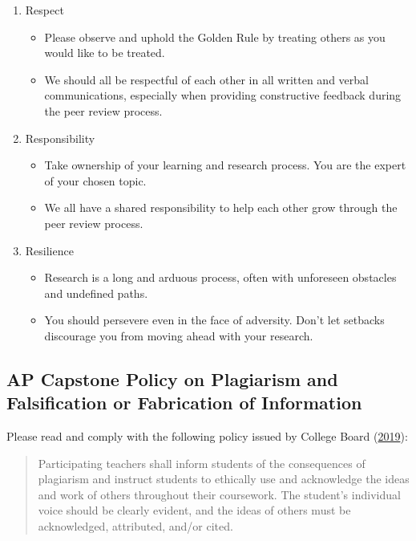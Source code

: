 \documentclass[11pt,]{article}
\providecommand{\tightlist}{%
  \setlength{\itemsep}{0pt}\setlength{\parskip}{0pt}}
\begin{document}
\begin{enumerate}
\def\labelenumi{\arabic{enumi}.}
\item
  Respect

  \begin{itemize}
  \tightlist
  \item
    Please observe and uphold the Golden Rule by treating others as you would like to be treated.
  \item
    We should all be respectful of each other in all written and verbal communications, especially when providing constructive feedback during the peer review process.
  \end{itemize}
\item
  Responsibility

  \begin{itemize}
  \tightlist
  \item
    Take ownership of your learning and research process. You are the expert of your chosen topic.
  \item
    We all have a shared responsibility to help each other grow through the peer review process.
  \end{itemize}
\item
  Resilience

  \begin{itemize}
  \tightlist
  \item
    Research is a long and arduous process, often with unforeseen obstacles and undefined paths.
  \item
    You should persevere even in the face of adversity. Don't let setbacks discourage you from moving ahead with your research.
  \end{itemize}
\end{enumerate}

\hypertarget{ap-capstone-policy-on-plagiarism-and-falsification-or-fabrication-of-information}{%
\subsection{AP Capstone Policy on Plagiarism and Falsification or Fabrication of Information}\label{ap-capstone-policy-on-plagiarism-and-falsification-or-fabrication-of-information}}

Please read and comply with the following policy issued by College Board (\protect\hyperlink{ref-cb}{2019}):

\begin{quote}
Participating teachers shall inform students of the consequences of plagiarism and instruct students to ethically use and acknowledge the ideas and work of others throughout their coursework. The student's individual voice should be clearly evident, and the ideas of others must be acknowledged, attributed, and/or cited.
\end{quote}
\end{document}
